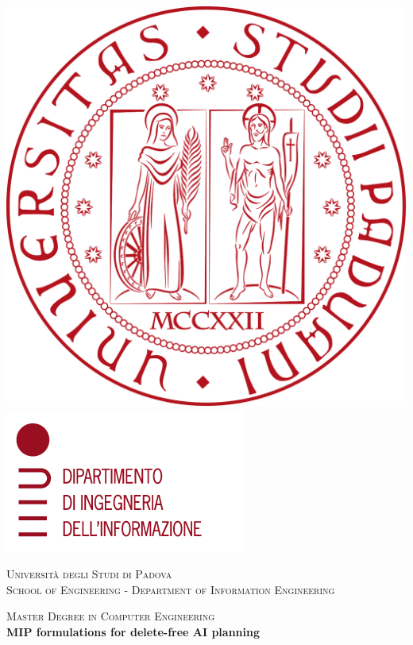 \documentclass[a4paper,twoside,12pt]{report}
\begin{document}
\begin{titlepage}
\begin{center}

\includegraphics[height=0.13\textheight]{logo_unipd.png}
\hfill
\includegraphics[height=0.13\textheight]{logo_dei.png}
\newline
\newline

\vspace{0.8cm}
\textsc{\LARGE Universit\`{a} degli Studi di Padova}\\
\vspace{1.6cm}
\textsc{\large 	School of Engineering - Department of Information Engineering}\\
\vspace{0.4cm}

\textsc{\large Master Degree in Computer Engineering}\\
\vfill
{ \LARGE \bfseries MIP formulations for delete-free AI planning}\\
\vspace{1cm}


\end{center}
\end{titlepage}
\end{document}
